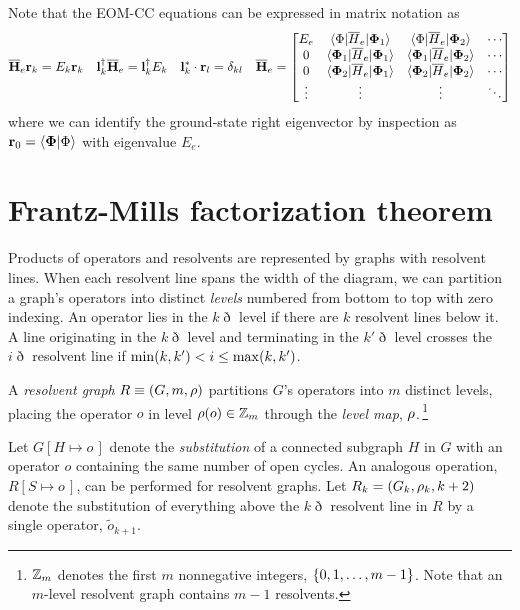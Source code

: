 \documentclass[11pt]{article}
\numberwithin{equation}{section}
\begin{document}
\begin{rmk}
Note that the EOM-CC equations can be expressed in matrix notation as
\begin{align}
\label{eq:eom-matrix-equations}
  \ol{\bo{H}}_e
  \bo{r}_k
=
  E_k
  \bo{r}_k
&&
  \bo{l}_k\dg
  \ol{\bo{H}}_e
=
  \bo{l}_k\dg
  E_k
&&
  \bo{l}_k^*\cdot
  \bo{r}_l
=
  \d_{kl}
&&
  \ol{\bo{H}}_e
=
\pma{
  E_e
&
  \ip{\F|\ol{H}_e|\bo{\F}_1}
&
  \ip{\F|\ol{H}_e|\bo{\F}_2}
&
  \cd
\\
  0
&
  \ip{\bm{\F}_1|\ol{H}_e|\bo{\F}_1}
&
  \ip{\bm{\F}_1|\ol{H}_e|\bo{\F}_2}
&
  \cd
\\
  0
&
  \ip{\bm{\F}_2|\ol{H}_e|\bo{\F}_1}
&
  \ip{\bm{\F}_2|\ol{H}_e|\bo{\F}_2}
&
  \cd
\\
  \vd
&
  \vd
&
  \vd
&
  \dd
}
\end{align}
where we can identify the ground-state right eigenvector by inspection as $\mathbf{r}_0=\langle\mathbf{\Phi }|\Phi \rangle$ with eigenvalue $E_e$.
\end{rmk}


\section{Frantz-Mills factorization theorem}

\begin{dfn}
\label{dfn:level}
Products of operators and resolvents are represented by graphs with resolvent lines.
When each resolvent line spans the width of the diagram, we can partition a graph's operators into distinct \textit{levels} numbered from bottom to top with zero indexing.
An operator lies in the $k\eth$ level if there are $k$ resolvent lines below it.
A line originating in the $k\eth$ level and terminating in the $k'{}\eth$ level crosses the $i\eth$ resolvent line if $\mathrm{min}(k,k')<i\leq \mathrm{max}(k,k')$.
\end{dfn}

\begin{dfn}
\label{dfn:resolvent-graph}
A \textit{resolvent graph} $R\equiv(G,m,\rho )$ partitions $G$'s operators into $m$ distinct levels, placing the operator $o$ in level $\rho (o)\in\mathbb{Z}_m$ through the \textit{level map}, $\rho $.\,\footnote{
  $\mathbb{Z}_m$ denotes the first $m$ nonnegative integers,
  $
  \{
    0,1,\ldots,m-1
  \}
  $.
  Note that an $m$-level resolvent graph contains $m-1$ resolvents.
}
\end{dfn}

\begin{dfn}
Let $G[H\mapsto o\,]$ denote the \textit{substitution} of a connected subgraph $H$ in $G$ with an operator $o$ containing the same number of open cycles.
An analogous operation,
$
  R[S\mapsto o\,]
$,
can be performed for resolvent graphs.
Let
$
  R_k
=
(
  G_k,
  \rho _k,
  k+2
)
$
denote the substitution of everything above the $k\eth$ resolvent line in $R$ by a single operator, $\widetilde{o}_{k+1}$.
\end{dfn}
\end{document}
